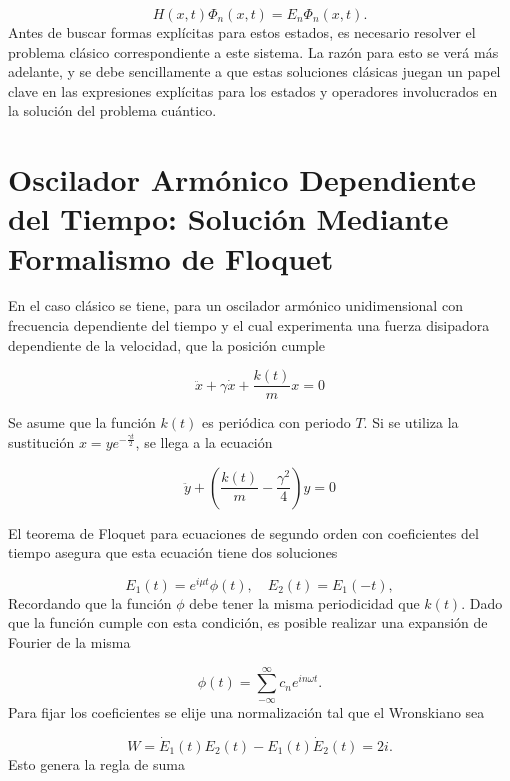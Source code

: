 \documentclass[10pt,a4paper]{report}
\begin{document}
\begin{equation}
H(x,t)\Phi_n(x,t)=E_n\Phi_n(x,t).
\end{equation} Antes de buscar formas explícitas para estos estados, es necesario resolver el problema clásico correspondiente a este sistema. La razón para esto se verá más adelante, y se debe sencillamente a que estas soluciones clásicas juegan un papel clave en las expresiones explícitas para los estados y operadores involucrados en la solución del problema cuántico.

\section{Oscilador Armónico Dependiente del Tiempo: Solución Mediante Formalismo de Floquet}

En el caso clásico \cite{HanngiFM} se tiene, para un oscilador armónico unidimensional con frecuencia dependiente del tiempo y el cual experimenta una fuerza disipadora dependiente de la velocidad, que la posición cumple

\begin{equation}
\ddot{x}+\gamma\dot{x}+\frac{k(t)}{m}x=0
\end{equation}

Se asume que la función $k(t)$ es periódica con periodo $T$. Si se utiliza la sustitución $x=ye^{-\frac{\gamma t}{2}}$, se llega a la ecuación

\begin{equation}
\ddot{y} +(\frac{k(t)}{m}-\frac{\gamma^2}{4})y=0
\end{equation}

El teorema de Floquet para ecuaciones de segundo orden con coeficientes del tiempo \cite{HanngiFM} asegura que esta ecuación tiene dos soluciones

\begin{equation}
E_1(t) = e^{i\mu t}\phi(t), \quad E_2(t)=E_1(-t),
\end{equation} Recordando que la función $\phi$ debe tener la misma periodicidad que $k(t)$. Dado que la función cumple con esta condición, es posible realizar una expansión de Fourier \cite{ArfkenMM} de la misma

\begin{equation}
\phi(t) = \sum_{-\infty}^\infty c_n e^{in\omega t}.
\end{equation} Para fijar los coeficientes se elije una normalización tal que el Wronskiano sea

\begin{equation}
W = \dot{E}_1(t)E_2(t)-E_1(t)\dot{E}_2(t) = 2i.
\end{equation}Esto genera la regla de suma
\end{document}
